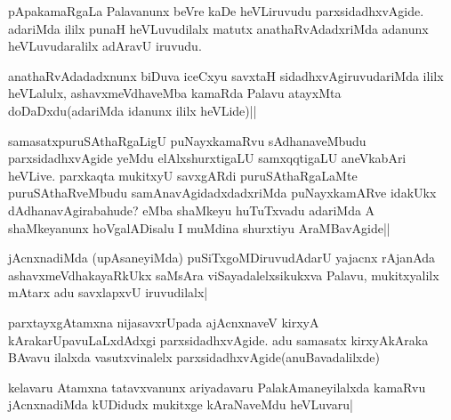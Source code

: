 
\begin{artha}
pApakamaRgaLa Palavanunx beVre kaDe heVLiruvudu parxsidadhxvAgide. adariMda ililx punaH heVLuvudilalx matutx anathaRvAdadxriMda adanunx heVLuvudaralilx adAravU iruvudu.
\end{artha}

\begin{artha}
anathaRvAdadadxnunx biDuva iceCxyu savxtaH sidadhxvAgiruvudariMda ililx heVLalulx, ashavxmeVdhaveMba kamaRda Palavu atayxMta doDaDxdu(adariMda idanunx ililx heVLide)||
\end{artha}


\begin{artha}
samasatxpuruSAthaRgaLigU puNayxkamaRvu sAdhanaveMbudu parxsidadhxvAgide yeMdu elAlxshurxtigaLU samxqqtigaLU aneVkabAri heVLive. parxkaqta mukitxyU savxgARdi puruSAthaRgaLaMte puruSAthaRveMbudu samAnavAgidadxdadxriMda puNayxkamARve idakUkx dAdhanavAgirabahude? eMba shaMkeyu huTuTxvadu adariMda A shaMkeyanunx hoVgalADisalu I muMdina shurxtiyu AraMBavAgide||
\end{artha}


\begin{artha}
jAcnxnadiMda (upAsaneyiMda) puSiTxgoMDiruvudAdarU yajacnx rAjanAda ashavxmeVdhakayaRkUkx saMsAra viSayadalelxsikukxva Palavu, mukitxyalilx mAtarx adu savxlapxvU iruvudilalx|
\end{artha}


\begin{artha}
parxtayxgAtamxna nijasavxrUpada ajAcnxnaveV kirxyA kArakarUpavuLaLxdAdxgi parxsidadhxvAgide. adu samasatx kirxyAkAraka BAvavu ilalxda vasutxvinalelx parxsidadhxvAgide(anuBavadalilxde)
\end{artha}


\begin{artha}
kelavaru Atamxna tatavxvanunx ariyadavaru PalakAmaneyilalxda kamaRvu jAcnxnadiMda kUDidudx mukitxge kAraNaveMdu heVLuvaru|
\end{artha}

